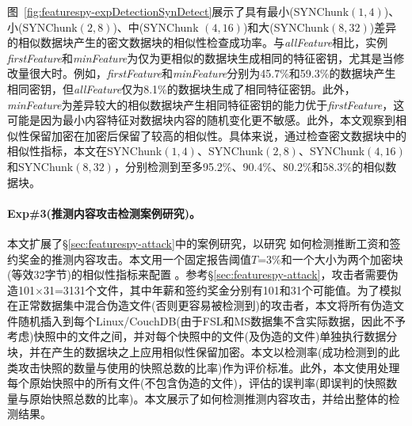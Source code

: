 图~\ref{fig:featurespy-expDetectionSynDetect}展示了具有最小(SYNChunk$(1,4)$)、小(SYNChunk$(2,8)$)、中(SYNChunk $(4,16)$)和大(SYNChunk$(8,32)$)差异的相似数据块产生的密文数据块的相似性检查成功率。与\textit{allFeature}相比，实例\textit{firstFeature}和\textit{minFeature}为仅为更相似的数据块生成相同的特征密钥，尤其是当修改量很大时。例如，\textit{firstFeature}和\textit{minFeature}分别为45.7\%和59.3\%的数据块产生相同密钥，但\textit{allFeature}仅为8.1\%的数据块生成了相同特征密钥。此外，\textit{minFeature}为差异较大的相似数据块产生相同特征密钥的能力优于\textit{firstFeature}，这可能是因为最小内容特征对数据块内容的随机变化更不敏感。此外，本文观察到相似性保留加密在加密后保留了较高的相似性。具体来说，通过检查密文数据块中的相似性指标，本文在SYNChunk$(1,4)$、SYNChunk$(2,8)$、SYNChunk$(4,16)$和SYNChunk$(8,32)$，分别检测到至多95.2\%、90.4\%、80.2\%和58.3\%的相似数据块。

\paragraph*{Exp\#3(推测内容攻击检测案例研究)。}
本文扩展了\S\ref{sec:featurespy-attack}中的案例研究，以研究 \sysnameF 如何检测推断工资和签约奖金的推测内容攻击。本文用一个固定报告阈值$T$=3\%和一个大小为两个加密块(等效32字节)的相似性指标来配置 \sysnameF。参考\S\ref{sec:featurespy-attack}，攻击者需要伪造101$\times$31=3131个文件，其中年薪和签约奖金分别有101和31个可能值。为了模拟在正常数据集中混合伪造文件(否则更容易被检测到)的攻击者，本文将所有伪造文件随机插入到每个Linux/CouchDB(由于FSL和MS数据集不含实际数据，因此不予考虑)快照中的文件之间，并对每个快照中的文件(及伪造的文件)单独执行数据分块，并在产生的数据块之上应用相似性保留加密。本文以检测率(\sysnameF 成功检测到的此类攻击快照的数量与使用的快照总数的比率)作为评价标准。此外，本文使用\sysnameF 处理每个原始快照中的所有文件(不包含伪造的文件)，评估\sysnameF 的误判率(即\sysnameF 误判的快照数量与原始快照总数的比率)。本文展示了\sysnameF 如何检测推测内容攻击，并给出整体的检测结果。


